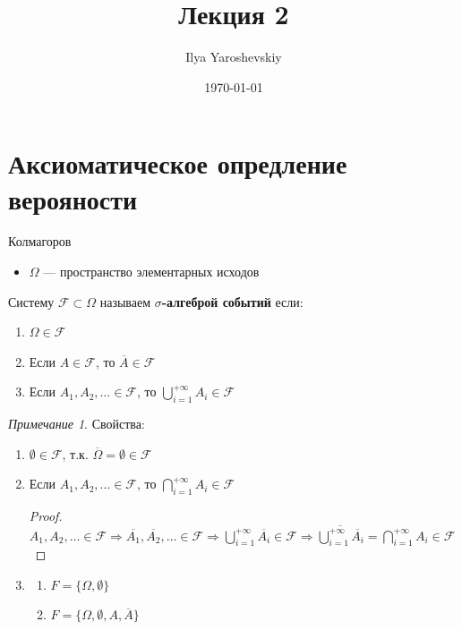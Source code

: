 \documentclass[english]{article}
\author{Ilya Yaroshevskiy}
\date{\today}
\title{Лекция 2}
\theoremstyle{plain}
\theoremstyle{remark}
\newtheorem*{remark}{Примечание}
\theoremstyle{definition}
\begin{document}
\maketitle
\tableofcontents


\section{Аксиоматическое опредление верояности}
\label{sec:org025b425}
Колмагоров \\

\begin{itemize}
\item \(\Omega\) --- пространство элементарных исходов
\end{itemize}
\begin{deifinition}
Систему \(\mathcal{F} \subset \Omega\) называем \textbf{\(\sigma\)-алгеброй событий} если:
\begin{enumerate}
\item \(\Omega \in \mathcal{F}\)
\item Если \(A \in \mathcal{F}\), то \(\overline{A} \in \mathcal{F}\)
\item Если \(A_1, A_2, \dots \in \mathcal{F}\), то \(\bigcup_{i=1}^{+ \infty} A_i \in \mathcal{F}\)
\end{enumerate}
\end{deifinition}
\begin{remark}
Свойства:
\begin{enumerate}
\item \(\emptyset \in \mathcal{F}\), т.к. \(\overline{\Omega} = \emptyset \in \mathcal{F}\)
\item Если \(A_1, A_2, \dots \in \mathcal{F}\), то \(\bigcap_{i = 1}^{+ \infty} A_i \in \mathcal{F}\)
\begin{proof}
\-\\
\(A_1, A_2, \dots \in \mathcal{F} \Rightarrow \overline{A_1}, \overline{A_2}, \dots \in \mathcal{F} \Rightarrow \bigcup_{i = 1}^{+ \infty} \overline{A_i} \in \mathcal{F} \Rightarrow \overline{\bigcup_{i = 1}^{+ \infty}\overline{A_i}} = \bigcap_{i = 1}^{+ \infty} A_i \in \mathcal{F}\)
\end{proof}
\item \begin{enumerate}
\item \(F = \{\Omega, \emptyset\}\)
\item \(F = \{\Omega, \emptyset, A, \overline{A}\}\)
\end{enumerate}
\end{enumerate}
\end{remark}
\end{document}
